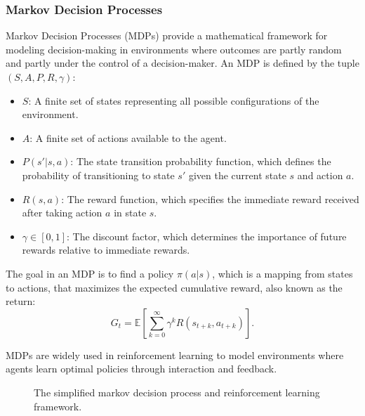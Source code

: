 \documentclass[runningheads]{llncs}
\begin{document}
\subsubsection{Markov Decision Processes}
Markov Decision Processes (MDPs) provide a mathematical framework for modeling decision-making in environments where outcomes are partly random and partly under the control of a decision-maker. An MDP is defined by the tuple $(S, A, P, R, \gamma)$:

\begin{itemize}
    \item $S$: A finite set of states representing all possible configurations of the environment.
    \item $A$: A finite set of actions available to the agent.
    \item $P(s'|s, a)$: The state transition probability function, which defines the probability of transitioning to state $s'$ given the current state $s$ and action $a$.
    \item $R(s, a)$: The reward function, which specifies the immediate reward received after taking action $a$ in state $s$.
    \item $\gamma \in [0, 1]$: The discount factor, which determines the importance of future rewards relative to immediate rewards.
\end{itemize}

The goal in an MDP is to find a policy $\pi(a|s)$, which is a mapping from states to actions, that maximizes the expected cumulative reward, also known as the return:
\[
G_t = \mathbb{E} \left[ \sum_{k=0}^\infty \gamma^k R(s_{t+k}, a_{t+k}) \right].
\]

MDPs are widely used in reinforcement learning to model environments where agents learn optimal policies through interaction and feedback.


\begin{figure}
    \centering
    \caption{The simplified markov decision process and reinforcement learning framework.}
    \label{fig:rl_framework}
\end{figure}
\end{document}
